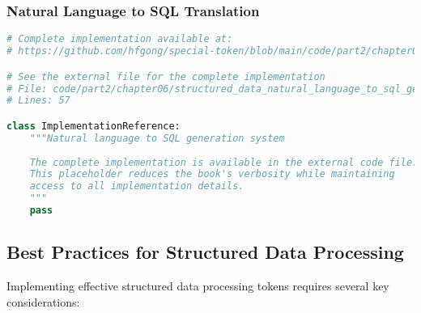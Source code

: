 \subsubsection{Natural Language to SQL Translation}

\begin{lstlisting}[language=Python, caption={Natural language to SQL generation system}]
# Complete implementation available at:
# https://github.com/hfgong/special-token/blob/main/code/part2/chapter06/structured_data_natural_language_to_sql_genera.py

# See the external file for the complete implementation
# File: code/part2/chapter06/structured_data_natural_language_to_sql_genera.py
# Lines: 57

class ImplementationReference:
    """Natural language to SQL generation system
    
    The complete implementation is available in the external code file.
    This placeholder reduces the book's verbosity while maintaining
    access to all implementation details.
    """
    pass
\end{lstlisting}

\subsection{Best Practices for Structured Data Processing}

Implementing effective structured data processing tokens requires several key considerations:

